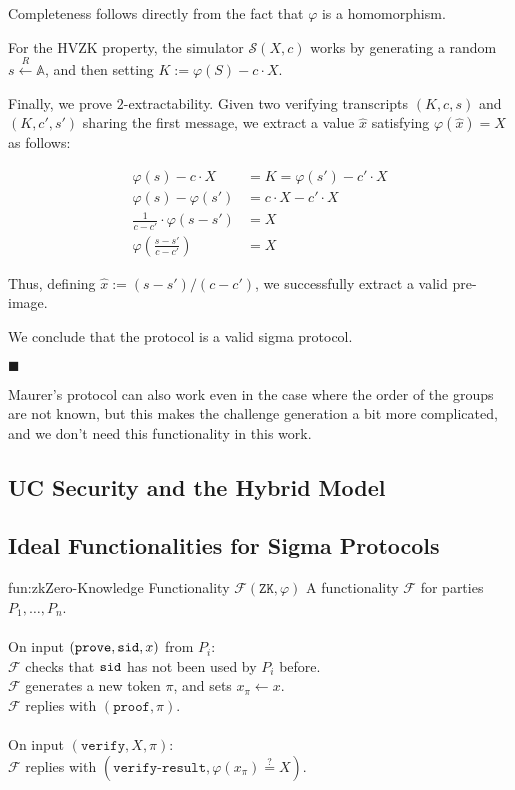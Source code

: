 Completeness follows directly from the fact that $\varphi$ is a homomorphism.

For the HVZK property, the simulator $\mathcal{S}(X, c)$ works by generating
a random $s \xleftarrow{R} \mathbb{A}$, and then setting $K := \varphi(S) - c \cdot X$.

Finally, we prove $2$-extractability. Given two verifying transcripts
$(K, c, s)$ and $(K, c', s')$ sharing the first message, we extract
a value $\hat{x}$ satisfying $\varphi(\hat{x}) = X$ as follows:

$$
\begin{aligned}
\varphi(s) - c \cdot X &= K = \varphi(s') - c' \cdot X\\
\varphi(s) - \varphi(s') &= c \cdot X - c' \cdot X\\
\frac{1}{c - c'} \cdot \varphi(s - s') &= X\\
\varphi \left(\frac{s - s'}{c - c'}\right) &= X
\end{aligned}
$$

Thus, defining $\hat{x} := (s - s') / (c - c')$, we successfully extract
a valid pre-image.

We conclude that the protocol is a valid sigma protocol.

$\blacksquare$

Maurer's protocol can also work even in the case where the order of
the groups are not known, but this makes the challenge generation
a bit more complicated, and we don't need this functionality in
this work.

\subsection{UC Security and the Hybrid Model}

\subsection{Ideal Functionalities for Sigma Protocols}

\begin{afunctionality}{fun:zk}{Zero-Knowledge Functionality $\mathcal{F}(\texttt{ZK}, \varphi)$}
A functionality $\mathcal{F}$ for parties $P_1, \ldots, P_n$.\\
\\
On input $(\texttt{prove}, \texttt{sid}, x)$ from $P_i$:\\
$\mathcal{F}$ checks that $\texttt{sid}$ has not been used by $P_i$ before.\\
$\mathcal{F}$ generates a new token $\pi$, and sets $x_\pi \gets x$.\\
$\mathcal{F}$ replies with $(\texttt{proof}, \pi)$.\\
\\
On input $(\texttt{verify}, X, \pi)$:\\
$\mathcal{F}$ replies with $(\texttt{verify-result}, \varphi(x_\pi) \stackrel{?}{=} X)$.\\


\end{afunctionality}

